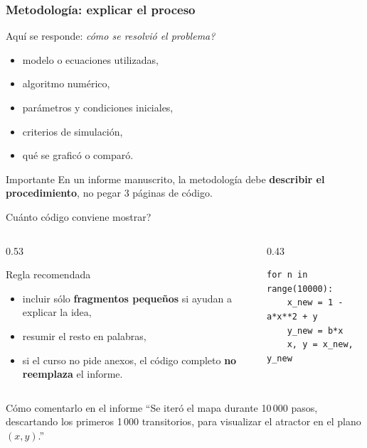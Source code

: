 \begin{frame}
\frametitle{Metodolog\'ia: explicar el proceso}
\begin{block}{Aqu\'i se responde: \textit{\textquestiondown{}c\'omo se resolvi\'o el problema?}}
\begin{itemize}
    \item modelo o ecuaciones utilizadas,
    \item algoritmo num\'erico,
    \item par\'ametros y condiciones iniciales,
    \item criterios de simulaci\'on,
    \item qu\'e se grafic\'o o compar\'o.
\end{itemize}
\end{block}

\vspace{0.2cm}
\begin{alertblock}{Importante}
En un informe manuscrito, la metodolog\'ia debe \textbf{describir el procedimiento}, no pegar 3 p\'aginas de c\'odigo.
\end{alertblock}
\end{frame}

\begin{frame}[fragile]{\textquestiondown{}Cu\'anto c\'odigo conviene mostrar?}
\begin{columns}[T]
\begin{column}{0.53\textwidth}
\begin{block}{Regla recomendada}
\begin{itemize}
    \item incluir s\'olo \textbf{fragmentos peque\~nos} si ayudan a explicar la idea,
    \item resumir el resto en palabras,
    \item si el curso no pide anexos, el c\'odigo completo \textbf{no reemplaza} el informe.
\end{itemize}
\end{block}
\end{column}
\begin{column}{0.43\textwidth}
\begin{lstlisting}
for n in range(10000):
    x_new = 1 - a*x**2 + y
    y_new = b*x
    x, y = x_new, y_new
\end{lstlisting}
\end{column}
\end{columns}

\vspace{0.15cm}
\begin{alertblock}{C\'omo comentarlo en el informe}
``Se iter\'o el mapa durante 10\,000 pasos, descartando los primeros 1\,000 transitorios, para visualizar el atractor en el plano $(x,y)$.''
\end{alertblock}
\end{frame}

